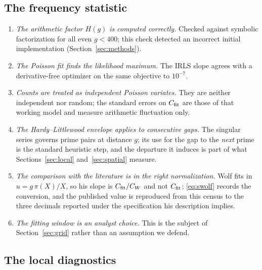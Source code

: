 \subsection*{The frequency statistic}

\begin{enumerate}
\item[V] \emph{The arithmetic factor $H(g)$ is computed correctly.} Checked against symbolic factorization for all even $g<400$; this check detected an incorrect initial implementation (Section~\ref{sec:methods}).
\item[V] \emph{The Poisson fit finds the likelihood maximum.} The IRLS slope agrees with a derivative-free optimizer on the same objective to $10^{-7}$.
\item[S] \emph{Counts are treated as independent Poisson variates.} They are neither independent nor random; the standard errors on $C_{\mathrm{fit}}$ are those of that working model and measure arithmetic fluctuation only.
\item[S] \emph{The Hardy--Littlewood envelope applies to consecutive gaps.} The singular series governs prime pairs at distance $g$; its use for the gap to the \emph{next} prime is the standard heuristic step, and the departure it induces is part of what Sections~\ref{sec:local} and~\ref{sec:spatial} measure.

\item[V] \emph{The comparison with the literature is in the right normalization.} Wolf fits in $u=g\,\pi(X)/X$, so his slope is $C_{\mathrm{fit}}/C_W$ and not $C_{\mathrm{fit}}$; \eqref{eq:swolf} records the conversion, and the published value is reproduced from this census to the three decimals reported under the specification his description implies.
\item[L] \emph{The fitting window is an analyst choice.} This is the subject of Section~\ref{sec:grid} rather than an assumption we defend.
\end{enumerate}

\subsection*{The local diagnostics}

